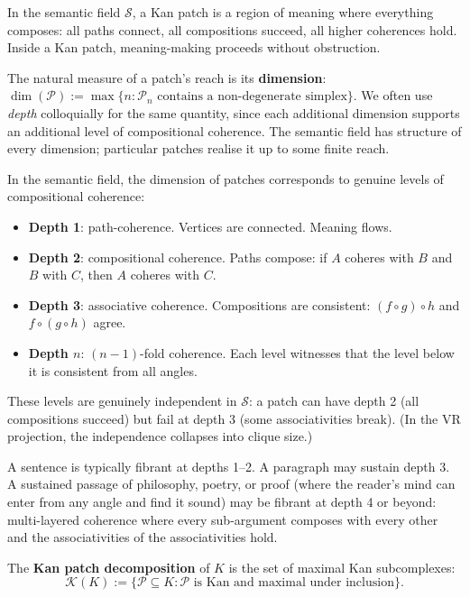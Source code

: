 In the semantic field $\mathcal{S}$, a Kan patch is a region of meaning where everything composes: all paths connect, all compositions succeed, all higher coherences hold. Inside a Kan patch, meaning-making proceeds without obstruction.

The natural measure of a patch's reach is its \textbf{dimension}: $\dim(\mathcal{P}) := \max\{n : \mathcal{P}_n \text{ contains a non-degenerate simplex}\}$. We often use \emph{depth} colloquially for the same quantity, since each additional dimension supports an additional level of compositional coherence. The semantic field has structure of every dimension; particular patches realise it up to some finite reach.

In the semantic field, the dimension of patches corresponds to genuine levels of compositional coherence:
\begin{itemize}
\item \textbf{Depth 1}: path-coherence. Vertices are connected. Meaning flows.
\item \textbf{Depth 2}: compositional coherence. Paths compose: if $A$ coheres with $B$ and $B$ with $C$, then $A$ coheres with $C$.
\item \textbf{Depth 3}: associative coherence. Compositions are consistent: $(f \circ g) \circ h$ and $f \circ (g \circ h)$ agree.
\item \textbf{Depth $n$}: $(n{-}1)$-fold coherence. Each level witnesses that the level below it is consistent from all angles.
\end{itemize}

These levels are genuinely independent in $\mathcal{S}$: a patch can have depth 2 (all compositions succeed) but fail at depth 3 (some associativities break). (In the VR projection, the independence collapses into clique size.)

A sentence is typically fibrant at depths 1--2. A paragraph may sustain depth 3. A sustained passage of philosophy, poetry, or proof (where the reader's mind can enter from any angle and find it sound) may be fibrant at depth 4 or beyond: multi-layered coherence where every sub-argument composes with every other and the associativities of the associativities hold.

\begin{definition}
\label{def:kan-decomp}
The \textbf{Kan patch decomposition} of $K$ is the set of maximal Kan subcomplexes:
\[
\mathcal{K}(K) := \{\mathcal{P} \subseteq K : \mathcal{P} \text{ is Kan and maximal under inclusion}\}.
\]
\end{definition}


